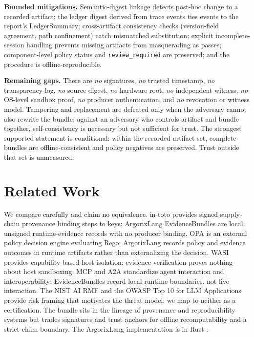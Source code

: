 \documentclass[conference]{IEEEtran}
\newcommand{\code}[1]{\texttt{\small #1}}
\newcommand{\Argorix}{%
\textcolor{argViolet}{A}\textcolor{argViolet}{r}\textcolor{argIndigo}{g}\textcolor{argIndigo}{o}\textcolor{argElectric}{r}\textcolor{argElectric}{i}\textcolor{argElectric}{x}\textcolor{argCyan}{L}\textcolor{argCyan}{a}\textcolor{argCyanBright}{n}\textcolor{argCyanBright}{g}\xspace}
\begin{document}
\noindent\textbf{Bounded mitigations.} Semantic-digest linkage detects post-hoc change to
a recorded artifact; the ledger digest derived from trace events ties events to the
report's LedgerSummary; cross-artifact consistency checks (version-field agreement, path
confinement) catch mismatched substitution; explicit incomplete-session handling prevents
missing artifacts from masquerading as passes; component-level policy status and
\code{review\_required} are preserved; and the procedure is offline-reproducible.

\noindent\textbf{Remaining gaps.} There are \emph{no} signatures, \emph{no} trusted
timestamp, \emph{no} transparency log, \emph{no} source digest, \emph{no} hardware root,
\emph{no} independent witness, \emph{no} OS-level sandbox proof, \emph{no} producer
authentication, and \emph{no} revocation or witness model. Tampering and replacement are
defeated only when the adversary cannot also rewrite the bundle; against an adversary who
controls artifact and bundle together, self-consistency is necessary but not sufficient
for trust. The strongest supported statement is conditional: within the recorded artifact
set, complete bundles are offline-consistent and policy negatives are preserved. Trust
outside that set is unmeasured.

\section{Related Work}\label{sec:related}
We compare carefully and claim no equivalence. in-toto \cite{torresarias2019intoto}
provides signed supply-chain provenance binding steps to keys; \Argorix EvidenceBundles
are local, unsigned runtime-evidence records with no producer binding. OPA
\cite{opa_docs} is an external policy decision engine evaluating Rego; \Argorix records
policy and evidence outcomes in runtime artifacts rather than externalizing the decision.
WASI \cite{wasi_intro} provides capability-based host isolation; evidence verification
proves nothing about host sandboxing. MCP and A2A \cite{mcp_spec_2025,a2a_spec}
standardize agent interaction and interoperability; EvidenceBundles record local runtime
boundaries, not live interaction. The NIST AI RMF \cite{tabassi2023airmf} and the OWASP
Top 10 for LLM Applications \cite{owasp_llm_top10} provide risk framing that motivates the
threat model; we map to neither as a certification. The bundle sits in the lineage of
provenance and reproducibility systems but trades signatures and trust anchors for
offline recomputability and a strict claim boundary. The \Argorix implementation is in
Rust \cite{rust_project}.
\end{document}

